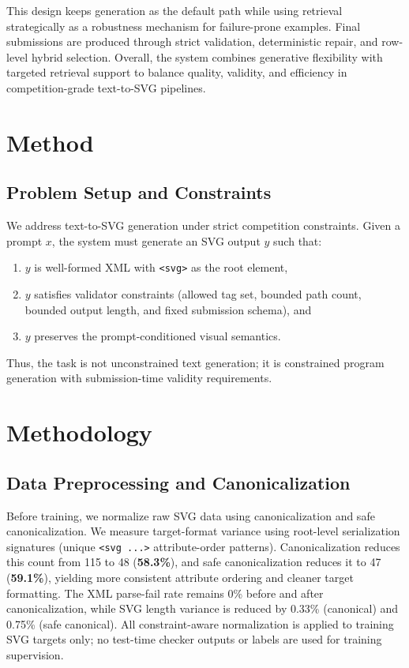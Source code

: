 \documentclass[11pt]{article}
\begin{document}
This design keeps generation as the default path while using retrieval strategically as a robustness mechanism for failure-prone examples.
Final submissions are produced through strict validation, deterministic repair, and row-level hybrid selection.
Overall, the system combines generative flexibility with targeted retrieval support to balance quality, validity, and efficiency in competition-grade text-to-SVG pipelines.

\section{Method}
\subsection{Problem Setup and Constraints}
We address text-to-SVG generation under strict competition constraints.
Given a prompt $x$, the system must generate an SVG output $y$ such that:
\begin{enumerate}
    \item $y$ is well-formed XML with \texttt{<svg>} as the root element,
    \item $y$ satisfies validator constraints (allowed tag set, bounded path count, bounded output length, and fixed submission schema), and
    \item $y$ preserves the prompt-conditioned visual semantics.
\end{enumerate}
Thus, the task is not unconstrained text generation; it is constrained program generation with submission-time validity requirements.

\section{Methodology}

\subsection{Data Preprocessing and Canonicalization}
Before training, we normalize raw SVG data using canonicalization and safe canonicalization.
We measure target-format variance using root-level serialization signatures (unique \texttt{<svg ...>} attribute-order patterns).
Canonicalization reduces this count from 115 to 48 (\textbf{58.3\%}), and safe canonicalization reduces it to 47 (\textbf{59.1\%}), yielding more consistent attribute ordering and cleaner target formatting.
The XML parse-fail rate remains 0\% before and after canonicalization, while SVG length variance is reduced by 0.33\% (canonical) and 0.75\% (safe canonical).
All constraint-aware normalization is applied to training SVG targets only; no test-time checker outputs or labels are used for training supervision.
\end{document}
